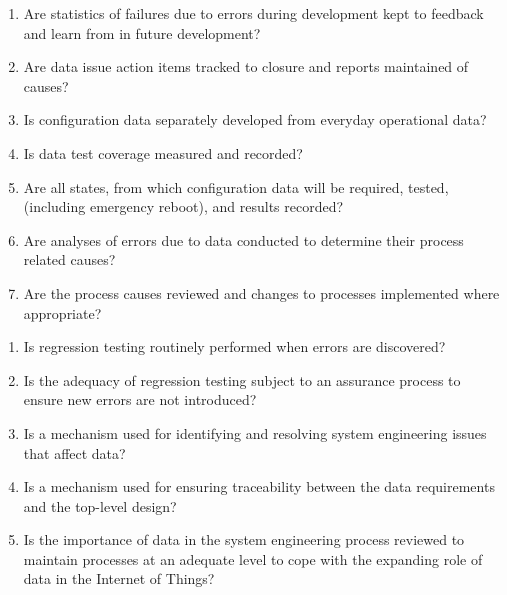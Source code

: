\begin{enumerate}
  \item Are statistics of failures due to \glspl{error} during development kept to feedback and learn from in future development?
  \item Are data issue action items tracked to closure and reports maintained of causes?
  \item Is \gls{configuration data} separately developed from everyday operational data?
  \item Is data test coverage measured and recorded?
  \item Are all states, from which \gls{configuration data} will be required, tested, (including emergency reboot), and results recorded?
  \item Are analyses of errors due to data conducted to determine their process related causes?
  \item Are the process causes reviewed and changes to processes implemented where appropriate?
\end{enumerate}

\begin{enumerate}
  \item Is regression testing routinely performed when errors are discovered?
  \item Is the adequacy of regression testing subject to an assurance process to ensure new errors are not introduced?
  \item Is a mechanism used for identifying and resolving system engineering issues that affect data?
  \item Is a mechanism used for ensuring \gls{traceability} between the data requirements and the top-level design?
  \item Is the importance of data in the system engineering process reviewed to maintain processes at an adequate level to cope with the expanding role of data in the Internet of Things? 
\end{enumerate}
